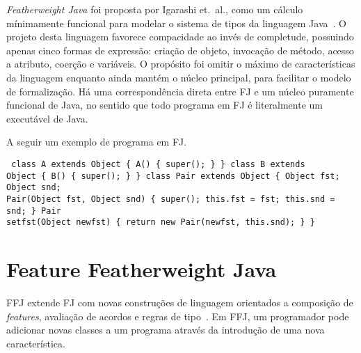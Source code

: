 \textit{Featherweight Java} foi proposta por Igarashi et.\ al., como um cálculo
mínimamente funcional para modelar o sistema de tipos da linguagem
Java~\cite{Igarashi99featherweightjava}.  O projeto desta linguagem favorece
compacidade ao invés de completude, possuindo apenas cinco formas de expressão:
criação de objeto, invocação de método, acesso a atributo, coerção e variáveis.
O propósito foi omitir o máximo de características da linguagem enquanto ainda
mantém o núcleo principal, para facilitar o modelo de formalização. Há uma
correspondência direta entre FJ e um núcleo puramente funcional de Java, no
sentido que todo programa em FJ é literalmente um executável de Java.


A seguir um exemplo de programa em FJ.

\begin{lstlisting} class A extends Object { A() { super(); } } class B extends
Object { B() { super(); } } class Pair extends Object { Object fst; Object snd;
Pair(Object fst, Object snd) { super(); this.fst = fst; this.snd = snd; } Pair
setfst(Object newfst) { return new Pair(newfst, this.snd); } } \end{lstlisting}

\section{Feature Featherweight Java}

FFJ extende FJ com novas construções de linguagem orientados a composição de
\textit{features}\cite{fop}, avaliação de acordos e regras de
tipo~\cite{Apel08featurefeatherweight}. Em FFJ, um programador pode adicionar
novas classes a um programa através da introdução de uma nova característica.
	








